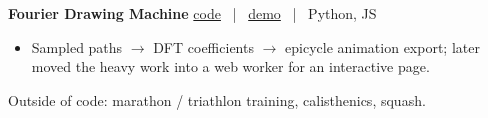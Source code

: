 \documentclass[10pt,letterpaper]{article}
\newcommand{\proj}[2]{%
  \vspace{6.5pt}%
  {\bodyfont\bfseries #1}%
  \hfill
  {\metafont\color{faint}\footnotesize #2}%
  \par\vspace{2pt}%
}
\begin{document}
{\proj{Fourier Drawing Machine}{%
  \href{https://github.com/DimitriChrysafis/FourierDrawer}{code}%
  \ {\color{hair}|}\ %
  \href{https://dimitrichrysafis.github.io/\#post/post2.md}{demo}%
  \ {\color{hair}|}\ %
  Python, JS}
\begin{itemize}
  \item Sampled paths $\rightarrow$ DFT coefficients $\rightarrow$ epicycle animation export; later moved the heavy work into a web worker for an interactive page.
\end{itemize}}

\vspace{12pt}
{\metafont\fontsize{8.6}{10}\selectfont\color{faint}%
Outside of code: marathon / triathlon training, calisthenics, squash.}
\end{document}

